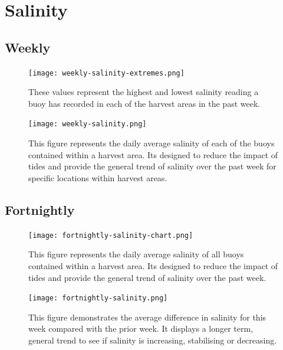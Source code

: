 \documentclass[10pt]{article}
\begin{document}
\pagebreak

\tableofcontents

\listoffigures

\pagebreak

\section{Salinity}
\subsection{Weekly}

\begin{figure}[H]
\centering
\texttt{[image: weekly-salinity-extremes.png]}
\caption[Weekly Minimum and Maximum Salinity]{These values represent the highest and lowest salinity reading a buoy has recorded in each of the harvest areas in the past week.}
\end{figure}

\begin{figure}[H]
\centering
\texttt{[image: weekly-salinity.png]}
\caption[Average Weekly Salinity Table]{This figure represents the daily average salinity of each of the buoys contained within a harvest area. Its designed to reduce the impact of tides and provide the general trend of salinity over the past week for specific locations within harvest areas.}
\end{figure}

\pagebreak

\subsection{Fortnightly}

\begin{figure}[H]
\centering
\texttt{[image: fortnightly-salinity-chart.png]}
\caption[Average Fortnightly Salinity Chart]{This figure represents the daily average salinity of all buoys contained within a harvest area. Its designed to reduce the impact of tides and provide the general trend of salinity over the past week.}
\end{figure}

\begin{figure}[H]
\centering
\texttt{[image: fortnightly-salinity.png]}
\caption[Average Fortnightly Salinity Difference]{This figure demonstrates the average difference in salinity for this week compared with the prior week. It displays a longer term, general trend to see if salinity is increasing, stabilising or decreasing.}
\end{figure}
\end{document}
